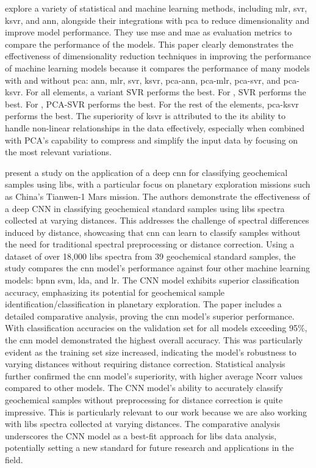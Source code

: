 \citet{rezaei_dimensionality_reduction} explore a variety of statistical and machine learning methods, including \gls{mlr}, \gls{svr}, \gls{ksvr}, and \gls{ann}, alongside their integrations with \gls{pca} to reduce dimensionality and improve model performance.
They use \gls{mse} and \gls{mae} as evaluation metrics to compare the performance of the models.
This paper clearly demonstrates the effectiveness of dimensionality reduction techniques in improving the performance of machine learning models because it compares the performance of many models with and without \gls{pca}: \gls{ann}, \gls{mlr}, \gls{svr}, \gls{ksvr}, \gls{pca}-\gls{ann}, \gls{pca}-\gls{mlr}, \gls{pca}-\gls{svr}, and \gls{pca}-\gls{ksvr}.
For all elements, a variant SVR performs the best.
For , SVR performs the best.
For , PCA-SVR performs the best.
For the rest of the elements, \gls{pca}-\gls{ksvr} performs the best.
The superiority of \gls{ksvr} is attributed to the its ability to handle non-linear relationships in the data effectively, especially when combined with PCA's capability to compress and simplify the input data by focusing on the most relevant variations.

\citet{yang_laser-induced_2022} present a study on the application of a deep \gls{cnn} for classifying geochemical samples using \gls{libs}, with a particular focus on planetary exploration missions such as China's Tianwen-1 Mars mission.
The authors demonstrate the effectiveness of a deep CNN in classifying geochemical standard samples using \gls{libs} spectra collected at varying distances.
This addresses the challenge of spectral differences induced by distance, showcasing that \gls{cnn} can learn to classify samples without the need for traditional spectral preprocessing or distance correction.
Using a dataset of over 18,000 \gls{libs} spectra from 39 geochemical standard samples, the study compares the \gls{cnn} model's performance against four other machine learning models: \gls{bpnn} \gls{svm}, \gls{lda}, and \gls{lr}.
The CNN model exhibits superior classification accuracy, emphasizing its potential for geochemical sample identification/classification in planetary exploration.
The paper includes a detailed comparative analysis, proving the \gls{cnn} model's superior performance.
With classification accuracies on the validation set for all models exceeding 95\%, the \gls{cnn} model demonstrated the highest overall accuracy.
This was particularly evident as the training set size increased, indicating the model's robustness to varying distances without requiring distance correction.
Statistical analysis further confirmed the \gls{cnn} model's superiority, with higher average Ncorr values compared to other models.
The CNN model's ability to accurately classify geochemical samples without preprocessing for distance correction is quite impressive.
This is particularly relevant to our work because we are also working with \gls{libs} spectra collected at varying distances.
The comparative analysis underscores the CNN model as a best-fit approach for \gls{libs} data analysis, potentially setting a new standard for future research and applications in the field.


